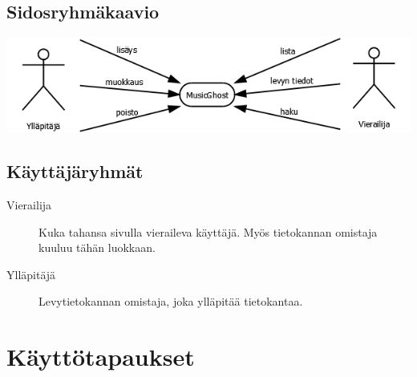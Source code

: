 \documentclass[a4paper,12pt]{report}
\begin{document}
\subsection{Sidosryhmäkaavio}
\vspace{1em}
\includegraphics[width=\textwidth]{sidosryhmakaavio}

\subsection{Käyttäjäryhmät}
\begin{description}
\item[Vierailija] Kuka tahansa sivulla vieraileva käyttäjä. Myös tietokannan
omistaja kuuluu tähän luokkaan.
\item[Ylläpitäjä] Levytietokannan omistaja,
joka ylläpitää tietokantaa.
\end{description}

\section{Käyttötapaukset}
\end{document}
